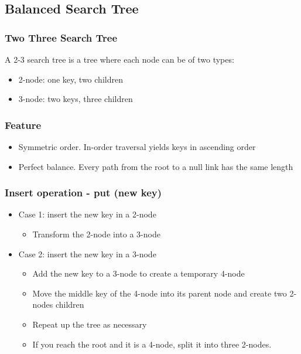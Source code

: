 \documentclass[a4paper]{article}
\begin{document}
\subsection{Balanced Search Tree}
\subsubsection*{Two Three Search Tree}
A 2-3 search tree is a tree where each node can be of two types:
\begin{itemize}
    \item 2-node: one key, two children
    \item 3-node: two keys, three children
\end{itemize}

\subsubsection*{Feature}
\begin{itemize}
    \item Symmetric order. In-order traversal yields keys in ascending order
    \item Perfect balance. Every path from the root to a null link has the same length
\end{itemize}

\subsubsection*{Insert operation - put (new key)}
\begin{itemize}
    \item Case 1: insert the new key in a 2-node
    \begin{itemize}
        \item Transform the 2-node into a 3-node
    \end{itemize}
    \item Case 2: insert the new key in a 3-node
    \begin{itemize}
        \item Add the new key to a 3-node to create a temporary 4-node
        \item Move the middle key of the 4-node into its parent node and create two 2-nodes children
        \item Repeat up the tree as necessary
        \item If you reach the root and it is a 4-node, split it into three 2-nodes.
    \end{itemize}
\end{itemize}
\end{document}
